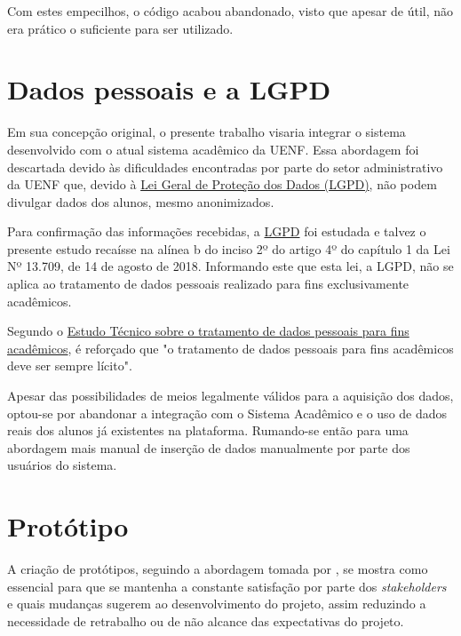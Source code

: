 Com estes empecilhos, o código acabou abandonado, visto que apesar de útil, não era prático o suficiente para ser utilizado.

\section{Dados pessoais e a LGPD} %

Em sua concepção original, o presente trabalho visaria integrar o sistema desenvolvido com o atual sistema acadêmico da UENF. Essa abordagem foi descartada devido às dificuldades encontradas por parte do setor administrativo da UENF que, devido à \href{https://www.planalto.gov.br/ccivil_03/_ato2015-2018/2018/lei/l13709.htm}{Lei Geral de Proteção dos Dados (LGPD)}, não podem divulgar dados dos alunos, mesmo anonimizados.

Para confirmação das informações recebidas, a \href{https://www.planalto.gov.br/ccivil_03/_ato2015-2018/2018/lei/l13709.htm}{LGPD} foi estudada e talvez o presente estudo recaísse na alínea b do inciso 2º do artigo 4º do capítulo 1 da Lei Nº 13.709, de 14 de agosto de 2018. Informando este que esta lei, a LGPD, não se aplica ao tratamento de dados pessoais realizado para fins exclusivamente acadêmicos.

Segundo o \href{https://www.gov.br/anpd/pt-br/assuntos/noticias/sei_00261-000810_2022_17.pdf}{Estudo Técnico sobre o tratamento de dados pessoais para fins acadêmicos}, é reforçado que "o tratamento de dados pessoais para fins acadêmicos deve ser sempre lícito".

Apesar das possibilidades de meios legalmente válidos para a aquisição dos dados, optou-se por abandonar a integração com o Sistema Acadêmico e o uso de dados reais dos alunos já existentes na plataforma. Rumando-se então para uma abordagem mais manual de inserção de dados manualmente por parte dos usuários do sistema.

\section{Protótipo} %

A criação de protótipos, seguindo a abordagem tomada por \cite{andre_interaction_2018}, se mostra como essencial para que se mantenha a constante satisfação por parte dos \textit{stakeholders} e quais mudanças sugerem ao desenvolvimento do projeto, assim reduzindo a necessidade de retrabalho ou de não alcance das expectativas do projeto.

